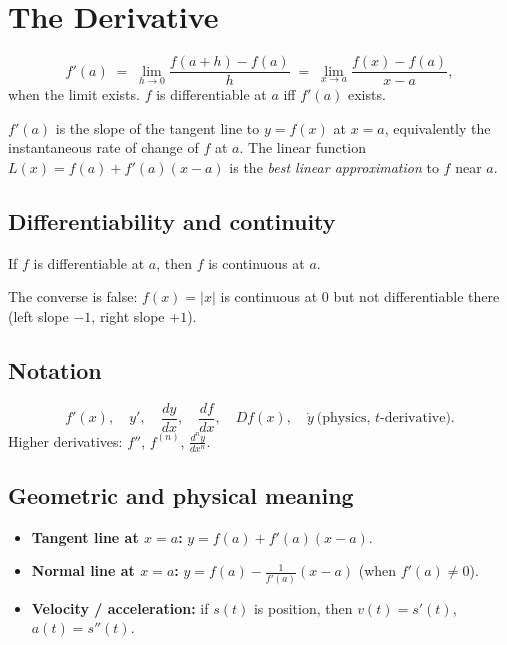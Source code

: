 \section{The Derivative}

\begin{definition}[Derivative]
\[ f'(a) \;=\; \lim_{h \to 0} \frac{f(a+h) - f(a)}{h} \;=\; \lim_{x \to a} \frac{f(x) - f(a)}{x - a}, \]
when the limit exists. $f$ is differentiable at $a$ iff $f'(a)$ exists.
\end{definition}

\begin{intuition}
$f'(a)$ is the slope of the tangent line to $y = f(x)$ at $x = a$, equivalently the instantaneous
rate of change of $f$ at $a$. The linear function $L(x) = f(a) + f'(a)(x-a)$ is the
\emph{best linear approximation} to $f$ near $a$.
\end{intuition}

\subsection{Differentiability and continuity}
\begin{proposition}
If $f$ is differentiable at $a$, then $f$ is continuous at $a$.
\end{proposition}
\noindent The converse is false: $f(x) = |x|$ is continuous at $0$ but not differentiable there
(left slope $-1$, right slope $+1$).

\subsection{Notation}
\[
f'(x), \quad y', \quad \frac{dy}{dx}, \quad \frac{df}{dx}, \quad Df(x), \quad \dot{y}\ \text{(physics, } t\text{-derivative)}.
\]
Higher derivatives: $f''$, $f^{(n)}$, $\tfrac{d^n y}{dx^n}$.

\subsection{Geometric and physical meaning}
\begin{itemize}[leftmargin=*,nosep]
  \item \textbf{Tangent line at $x = a$:} $y = f(a) + f'(a)(x-a)$.
  \item \textbf{Normal line at $x = a$:} $y = f(a) - \tfrac{1}{f'(a)}(x-a)$ (when $f'(a) \neq 0$).
  \item \textbf{Velocity / acceleration:} if $s(t)$ is position, then $v(t) = s'(t)$, $a(t) = s''(t)$.
\end{itemize}

